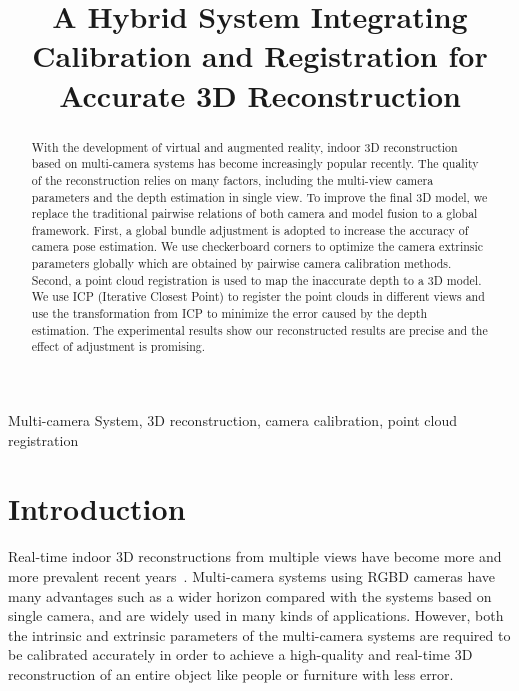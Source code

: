 \documentclass{article}
\begin{document}
\sloppy

\def\x{{\mathbf x}}
\def\L{{\cal L}}


\title{A Hybrid System Integrating Calibration and Registration for Accurate 3D Reconstruction}
%
\address{University of Science and Technology of China}


\maketitle


%
\begin{abstract}
With the development of virtual and augmented reality, indoor 3D reconstruction based on multi-camera systems has become increasingly popular recently. The quality of the reconstruction relies on many factors, including the multi-view camera parameters and the depth estimation in single view. To improve the final 3D model, we replace the traditional pairwise relations of both camera and model fusion to a global framework. First, a global bundle adjustment is adopted to increase the accuracy of camera pose estimation. We use checkerboard corners to optimize the camera extrinsic parameters globally which are obtained by pairwise camera calibration methods. Second, a point cloud registration is used to map the inaccurate depth to a 3D model. We use ICP (Iterative Closest Point) to register the point clouds in different views and use the transformation from ICP to minimize the error caused by the depth estimation. The experimental results show our reconstructed results are precise and the effect of adjustment is promising.
\end{abstract}
%
\begin{keywords}
Multi-camera System, 3D reconstruction, camera calibration, point cloud registration
\end{keywords}
%
\section{Introduction}

Real-time indoor 3D reconstructions from multiple views have become more and more prevalent recent years~\cite{dou2016fusion4d,orts2016holoportation}. Multi-camera systems using RGBD cameras have many advantages such as a wider horizon compared with the systems based on single camera, and are widely used in many kinds of applications. However, both the intrinsic and extrinsic parameters of the multi-camera systems are required to be calibrated accurately in order to achieve a high-quality and real-time 3D reconstruction of an entire object like people or furniture with less error.
\end{document}
